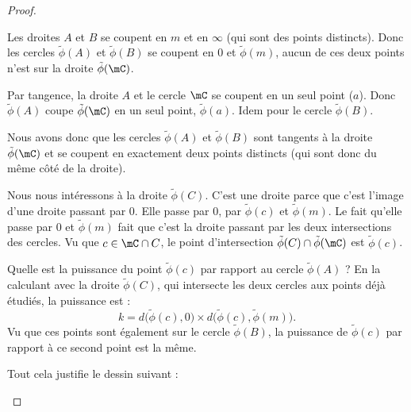 \begin{proof}
\begin{subproof}
            Les droites \( A\) et \( B\) se coupent en \( m\) et en \( \infty\) (qui sont des points distincts). Donc les cercles \( \tilde \phi(A)\) et \( \tilde \phi(B)\) se coupent en \( 0\) et \( \tilde \phi(m)\), aucun de ces deux points n'est sur la droite \( \tilde \phi(\mC)\).

            Par tangence, la droite \( A\) et le cercle \( \mC\) se coupent en un seul point (\( a\)). Donc \( \tilde \phi(A)\) coupe \( \tilde \phi(\mC)\) en un seul point, \( \tilde \phi(a)\). Idem pour le cercle \( \tilde \phi(B)\).

            Nous avons donc que les cercles \( \tilde \phi(A)\) et \( \tilde \phi(B)\) sont tangents à la droite \( \tilde \phi(\mC)\) et se coupent en exactement deux points distincts (qui sont donc du même côté de la droite).

            Nous nous intéressons à la droite \( \tilde \phi(C)\). C'est une droite parce que c'est l'image d'une droite passant par \( 0\). Elle passe par \( 0\), par \( \tilde \phi(c)\) et \( \tilde \phi(m)\). Le fait qu'elle passe par \( 0\) et \( \tilde \phi(m)\) fait que c'est la droite passant par les deux intersections des cercles. Vu que \( c\in \mC\cap C\), le point d'intersection \( \tilde \phi(C)\cap \tilde \phi(\mC)\) est \( \tilde \phi(c)\).

            Quelle est la puissance du point \( \tilde \phi(c)\) par rapport au cercle \( \tilde \phi(A)\) ? En la calculant avec la droite \( \tilde \phi(C)\), qui intersecte les deux cercles aux points déjà étudiés, la puissance est :
            \begin{equation}
                k=d\big( \tilde \phi(c),0 \big)\times d\big( \tilde \phi(c),\tilde \phi(m) \big).
            \end{equation}
            Vu que ces points sont également sur le cercle \( \tilde \phi(B)\), la puissance de \( \tilde \phi(c)\) par rapport à ce second point est la même.

            Tout cela justifie le dessin suivant :

            \begin{center}
                
            \end{center}


\end{subproof}
\end{proof}
